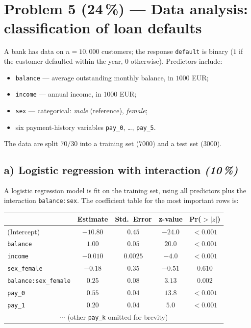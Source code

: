 \documentclass[11pt,a4paper]{article}
\newcommand{\points}[1]{\textbf{(#1\,\%)}}
\newcommand{\subpoints}[1]{\textit{(#1\,\%)}}
\begin{document}
\vfill\eject

\section*{Problem 5 \points{24} --- Data analysis: classification of loan defaults}

A bank has data on $n = 10{,}000$ customers; the response \texttt{default} is binary ($1$ if the customer defaulted within the year, $0$ otherwise). Predictors include:
\begin{itemize}
  \item \texttt{balance} --- average outstanding monthly balance, in $1000$ EUR;
  \item \texttt{income} --- annual income, in $1000$ EUR;
  \item \texttt{sex} --- categorical: \emph{male} (reference), \emph{female};
  \item six payment-history variables \texttt{pay\_0}, \dots, \texttt{pay\_5}.
\end{itemize}

The data are split $70/30$ into a training set ($7000$) and a test set ($3000$).

\subsection*{a) Logistic regression with interaction \subpoints{10}}

A logistic regression model is fit on the training set, using all predictors plus the interaction \texttt{balance:sex}. The coefficient table for the most important rows is:

\begin{center}\small
\begin{tabular}{lcccc}
\toprule
 & \textbf{Estimate} & \textbf{Std.\ Error} & \textbf{z-value} & \textbf{Pr($>|z|$)} \\
\midrule
(Intercept)             & $-10.80$  & $0.45$     & $-24.0$ & $<0.001$ \\
\texttt{balance}        & $1.00$    & $0.05$     & $20.0$  & $<0.001$ \\
\texttt{income}         & $-0.010$  & $0.0025$   & $-4.0$  & $<0.001$ \\
\texttt{sex\_female}    & $-0.18$   & $0.35$     & $-0.51$ & $0.610$  \\
\texttt{balance:sex\_female} & $0.25$ & $0.08$  & $3.13$  & $0.002$  \\
\midrule
\texttt{pay\_0}         & $0.55$    & $0.04$     & $13.8$  & $<0.001$ \\
\texttt{pay\_1}         & $0.20$    & $0.04$     & $5.0$   & $<0.001$ \\
\multicolumn{5}{c}{$\cdots$ (other \texttt{pay\_k} omitted for brevity)} \\
\bottomrule
\end{tabular}
\end{center}
\end{document}
